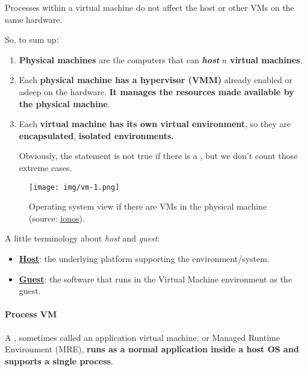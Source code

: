 \highspace
Processes within a virtual machine do not affect the host or other VMs on the same hardware.

\highspace
So, to sum up:
\begin{enumerate}
    \item \textbf{Physical machines} are the computers that can \textbf{\emph{host}} $n$ \textbf{virtual machines}.
    
    \item Each \textbf{physical machine has a hypervisor (VMM)} already enabled or asleep on the hardware. \textbf{It manages the resources made available by the physical machine}.
    
    \item Each \textbf{virtual machine has its own virtual environment}, so they are \textbf{encapsulated}, \textbf{isolated environments.} 
    
    Obviously, the statement is not true if there is a , but we don't count those extreme cases.\cite{wu2017access}
\end{enumerate}

\newpage

\begin{figure}[!htp]
    \centering
    \texttt{[image: img/vm-1.png]}
    \caption{Operating system view if there are VMs in the physical machine (source: \href{https://www.ionos.co.uk/digitalguide/server/know-how/virtual-machines/}{ionos}).}
\end{figure}

\noindent
A little terminology about \emph{host} and \emph{guest}:
\begin{itemize}
    \item \textbf{\underline{Host}}: the underlying platform supporting the environment/system.
    \item \textbf{\underline{Guest}}: the software that runs in the Virtual Machine environment as the guest.
\end{itemize}

\newpage

\paragraph{Process VM}\label{Process VM}

A , sometimes called an application virtual machine, or Managed Runtime Environment (MRE), \textbf{runs as a normal application inside a host OS and supports a single process}. 

